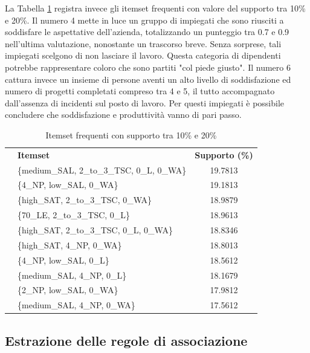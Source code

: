 \documentclass[a4paper]{article}
\newcounter{rowno}
\begin{document}
La Tabella \ref{tab:frequent_sup_10_20} registra invece gli itemset frequenti con valore del supporto tra 10\% e 20\%. Il numero 4 mette in luce un gruppo di impiegati che sono riusciti a soddisfare le aspettative dell'azienda, totalizzando un punteggio tra 0.7 e 0.9 nell'ultima valutazione, nonostante un trascorso breve. Senza sorprese, tali impiegati scelgono di non lasciare il lavoro. Questa categoria di dipendenti potrebbe rappresentare coloro che sono partiti "col piede giusto". Il numero 6 cattura invece un insieme di persone aventi un alto livello di soddisfazione ed numero di progetti completati compreso tra 4 e 5, il tutto accompagnato dall'assenza di incidenti sul posto di lavoro. Per questi impiegati è possibile concludere che soddisfazione e produttività vanno di pari passo.  

\begin{table}[h]
\centering
\begingroup
\setlength{\tabcolsep}{5pt} %
\renewcommand{\arraystretch}{1} %
\setcounter{rowno}{0}

\begin{tabularx}{\textwidth}{|>{\stepcounter{rowno}\therowno}c|X|c|}
\hline
\multicolumn{1}{r}{\#} & {\textbf{Itemset}} & {\textbf{Supporto (\%)}} \\

& \{medium\_SAL, 2\_to\_3\_TSC, 0\_L, 0\_WA\} & 19.7813 \\ 
& \{4\_NP, low\_SAL, 0\_WA\} & 19.1813 \\ 
& \{high\_SAT, 2\_to\_3\_TSC, 0\_WA\} & 18.9879 \\ 
& \{70\_LE, 2\_to\_3\_TSC, 0\_L\} & 18.9613 \\ 
& \{high\_SAT, 2\_to\_3\_TSC, 0\_L, 0\_WA\} & 18.8346 \\ 
& \{high\_SAT, 4\_NP, 0\_WA\} & 18.8013 \\ 
& \{4\_NP, low\_SAL, 0\_L\} & 18.5612 \\ 
& \{medium\_SAL, 4\_NP, 0\_L\} & 18.1679 \\ 
& \{2\_NP, low\_SAL, 0\_WA\} & 17.9812 \\ 
& \{medium\_SAL, 4\_NP, 0\_WA\} & 17.5612 \\ 
\hline
\end{tabularx}
\endgroup
\caption{Itemset frequenti con supporto tra 10\% e 20\%}
\label{tab:frequent_sup_10_20}
\end{table}



\subsection{Estrazione delle regole di associazione}
\end{document}
